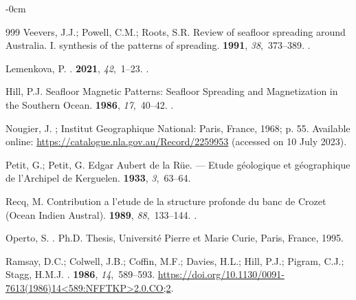 \documentclass[geomatics,article,accept,pdftex,moreauthors]{Definitions/mdpi}
\begin{document}
\begin{adjustwidth}{-\extralength}{0cm}
\begin{thebibliography}{999}
Veevers, J.J.; Powell, C.M.; Roots, S.R.
\newblock Review of seafloor spreading around Australia. I. synthesis of the
  patterns of spreading.
 {\bf 1991}, {\em
  38},~373--389.
.

Lemenkova, P.
.
 {\bf 2021}, {\em 42},~1--23.
.

Hill, P.J.
\newblock Seafloor Magnetic Patterns: Seafloor Spreading and Magnetization in
  the Southern Ocean.
 {\bf 1986}, {\em 17},~40--42.
.

Nougier, J.
; Institut Geographique National: Paris, France, 1968; p. 55. %
 Available online:  \url{https://catalogue.nla.gov.au/Record/2259953}  (accessed on 10 July 2023). %

Petit, G.; Petit, G.
\newblock Edgar Aubert de la Rüe. — Etude géologique et géographique de
  l’Archipel de Kerguelen.
 {\bf 1933}, {\em
  3},~63--64.

Recq, M.
\newblock Contribution a l'etude de la structure profonde du banc de Crozet
  (Ocean Indien Austral).
 {\bf 1989}, {\em 88},~133--144.
.

Operto, S.
.
\newblock Ph.D. Thesis, Université Pierre et Marie Curie, %
  Paris, France,  1995.

Ramsay, D.C.; Colwell, J.B.; Coffin, M.F.; Davies, H.L.; Hill, P.J.; Pigram,
  C.J.; Stagg, H.M.J.
.
 {\bf 1986}, {\em 14},~589--593.
\newblock
  {\url{https://doi.org/10.1130/0091-7613(1986)14<589:NFFTKP>2.0.CO;2}}.


\end{thebibliography}
\end{adjustwidth}
\end{document}
